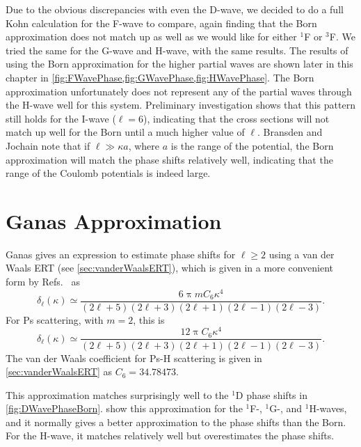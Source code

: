 \documentclass[Dissertation.tex]{subfiles}
\begin{document}
Due to the obvious discrepancies with even the D-wave, we decided to do a 
full Kohn calculation for the F-wave to compare, again finding that the Born 
approximation does not match up as well as we would like for either
$^1$F or $^3$F. We tried the same for the G-wave and H-wave, with the same results.
The results of using the Born approximation for the higher partial waves are 
shown later in this chapter in
\cref{fig:FWavePhase,fig:GWavePhase,fig:HWavePhase}. The Born approximation 
unfortunately does not represent any of the partial waves through the H-wave 
well for this system. Preliminary investigation shows that this pattern still holds
for the I-wave ($\ell = 6$), indicating that the cross sections will not match
up well for the Born until a much higher value of $\ell$. Bransden and
Jochain \cite[p.590]{Bransden2003} note that if $\ell \gg \kappa a$, where $a$ is
the range of the potential, the Born approximation will match the phase shifts
relatively well, indicating that the range of the Coulomb potentials is
indeed large.




\section{Ganas Approximation}
\label{sec:GanasPhase}

Ganas \cite{Ganas1972} gives an expression to estimate phase shifts for
$\ell \geq 2$ using a van der Waals ERT (see \cref{sec:vanderWaalsERT}),
which is given in a more convenient form by
Refs.~\cite{Fabrikant2014a,Mitroy2003a,Swann2015} as
\begin{equation}
\label{eq:vdWPhase}
\delta_\ell(\kappa) \simeq \frac{6 \uppi m C_6 \kappa^4}{(2\ell+5)(2\ell+3)(2\ell+1)(2\ell-1)(2\ell-3)}.
\end{equation}
For Ps scattering, with $m = 2$, this is
\begin{equation}
\label{eq:vdWPhase}
\delta_\ell(\kappa) \simeq \frac{12 \uppi C_6 \kappa^4}{(2\ell+5)(2\ell+3)(2\ell+1)(2\ell-1)(2\ell-3)}.
\end{equation}
The van der Waals coefficient for Ps-H scattering is given in
\cref{sec:vanderWaalsERT} as $C_6 = 34.78473$.

This approximation matches surprisingly well to the $^1$D phase shifts in
\cref{fig:DWavePhaseBorn}. 
show this approximation for the $^1$F-, $^1$G-, and $^1$H-waves, and it normally
gives a better approximation to the phase shifts than the Born. For the H-wave,
it matches relatively well but overestimates the phase shifts.
\end{document}
